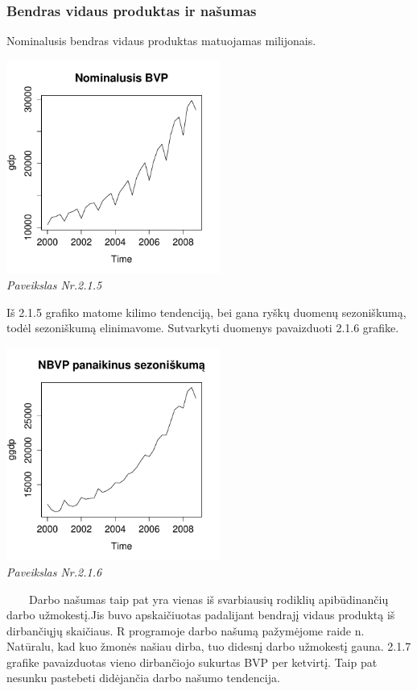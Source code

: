 \documentclass[12pt,a4paper]{article}
\theoremstyle{change}\newtheorem{salyga}{Uždavinys}
\begin{document}
\subsubsection{Bendras vidaus produktas ir našumas}

\hspace{40pt}Nominalusis bendras vidaus produktas matuojamas milijonais. 
\vskip 8pt
\begin{center}
\includegraphics[width=70mm,height=70mm]{ngdp}
\\
\textit{Paveikslas Nr.2.1.5}
\end{center}
Iš 2.1.5 grafiko matome kilimo tendenciją, bei gana ryškų duomenų sezoniškumą, todėl sezoniškumą elinimavome. Sutvarkyti duomenys pavaizduoti 2.1.6 grafike. 
\vskip 8pt
\begin{center}
\includegraphics[width=70mm,height=70mm]{gngdp}
\\
\textit{Paveikslas Nr.2.1.6}
\end{center}
\vskip 8pt
$\qquad$Darbo našumas taip pat yra vienas iš svarbiausių rodiklių apibūdinančių darbo užmokestį.Jis buvo apskaičiuotas padalijant bendrajį vidaus produktą iš dirbančiųjų skaičiaus. R programoje darbo našumą pažymėjome raide n. Natūralu, kad kuo žmonės našiau dirba, tuo didesnį darbo užmokestį gauna. 2.1.7 grafike pavaizduotas vieno dirbančiojo sukurtas BVP per ketvirtį. Taip pat nesunku pastebeti didėjančia darbo našumo tendencija. 
\end{document}

